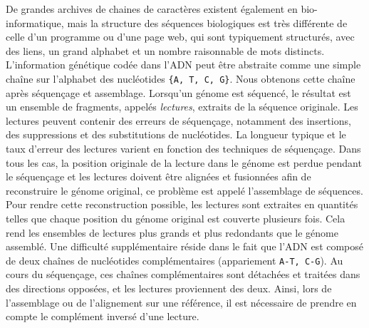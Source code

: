 De grandes archives de chaines de caractères existent également en bio-informatique, mais la structure des séquences biologiques est très différente de celle d'un programme ou d'une page web, qui sont typiquement structurés, avec des liens, un grand alphabet et un nombre raisonnable de mots distincts.
L'information génétique codée dans l'ADN peut être abstraite comme une simple chaîne sur l'alphabet des nucléotides \texttt{\{A, T, C, G\}}.
Nous obtenons cette chaîne après séquençage et assemblage. Lorsqu'un génome est séquencé, le résultat est un ensemble de fragments, appelés \emph{lectures}, extraits de la séquence originale. Les lectures peuvent contenir des erreurs de séquençage, notamment des insertions, des suppressions et des substitutions de nucléotides. La longueur typique et le taux d'erreur des lectures varient en fonction des techniques de séquençage.
%
Dans tous les cas, la position originale de la lecture dans le génome est perdue pendant le séquençage et les lectures doivent être alignées et fusionnées afin de reconstruire le génome original, ce problème est appelé l'assemblage de séquences. Pour rendre cette reconstruction possible, les lectures sont extraites en quantités telles que chaque position du génome original est couverte plusieurs fois. Cela rend les ensembles de lectures plus grands et plus redondants que le génome assemblé. 
Une difficulté supplémentaire réside dans le fait que l'ADN est composé de deux chaînes de nucléotides complémentaires (appariement \texttt{A-T, C-G}). Au cours du séquençage, ces chaînes complémentaires sont détachées et traitées dans des directions opposées, et les lectures proviennent des deux. Ainsi, lors de l'assemblage ou de l'alignement sur une référence, il est nécessaire de prendre en compte le complément inversé d'une lecture.


